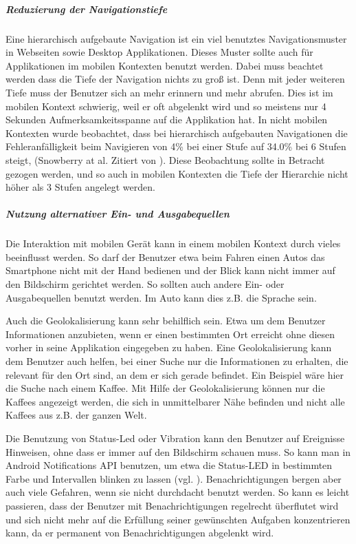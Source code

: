 \subparagraph{Reduzierung der Navigationstiefe} 
\label{subp:reduziere_das_w_hlen}

Eine hierarchisch aufgebaute Navigation ist ein viel benutztes Navigationsmuster in Webseiten sowie Desktop Applikationen. Dieses Muster sollte auch für Applikationen im mobilen Kontexten benutzt werden. Dabei muss beachtet werden dass die Tiefe der Navigation nichts zu groß ist. Denn mit jeder weiteren Tiefe muss der Benutzer sich an mehr erinnern und mehr abrufen. Dies ist im mobilen Kontext schwierig, weil er oft abgelenkt wird und so meistens nur 4 Sekunden Aufmerksamkeitsspanne auf die Applikation hat\cite{Oulasvirta:2005vn}. In nicht mobilen Kontexten wurde beobachtet, dass bei hierarchisch aufgebauten Navigationen die Fehleranfälligkeit beim Navigieren von 4\% bei einer Stufe auf 34.0\% bei 6 Stufen steigt, (Snowberry at al. Zitiert von \cite{Chae:2004gp}). Diese Beobachtung sollte in Betracht gezogen werden, und so auch in mobilen Kontexten die Tiefe der Hierarchie nicht höher als 3 Stufen angelegt werden.

\subparagraph{Nutzung alternativer Ein- und Ausgabequellen}
\label{subp:nutze_alternative_eingabenger_ten}

Die Interaktion mit mobilen Gerät kann in einem mobilen Kontext durch vieles beeinflusst werden. So darf der Benutzer etwa beim Fahren einen Autos das Smartphone nicht mit der Hand bedienen und der Blick kann nicht immer auf den Bildschirm gerichtet werden. So sollten auch andere Ein- oder Ausgabequellen benutzt werden. Im Auto kann dies z.B. die Sprache sein.

Auch die Geolokalisierung kann sehr behilflich sein. Etwa um dem Benutzer Informationen anzubieten, wenn er einen bestimmten Ort erreicht ohne diesen vorher in seine Applikation eingegeben zu haben. Eine Geolokalisierung kann dem Benutzer auch helfen, bei einer Suche nur die Informationen zu erhalten, die relevant für den Ort sind, an dem er sich gerade befindet. Ein Beispiel wäre hier die Suche nach einem Kaffee. Mit Hilfe der Geolokalisierung können nur die Kaffees angezeigt werden, die sich in unmittelbarer Nähe befinden und nicht alle Kaffees aus z.B. der ganzen Welt. 

Die Benutzung von Status-Led oder Vibration kann den Benutzer auf Ereignisse Hinweisen, ohne dass er immer auf den Bildschirm schauen muss. So kann man in Android Notifications API benutzen, um etwa die Status-LED in bestimmten Farbe und Intervallen blinken zu lassen (vgl. \cite{androidNotApi}). Benachrichtigungen bergen aber auch viele Gefahren, wenn sie nicht durchdacht benutzt werden. So kann es leicht passieren, dass der Benutzer mit Benachrichtigungen regelrecht überflutet wird und sich nicht mehr auf die Erfüllung seiner gewünschten Aufgaben konzentrieren kann, da er permanent von Benachrichtigungen abgelenkt wird.

